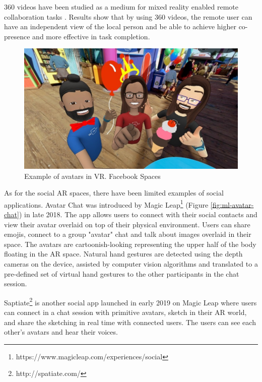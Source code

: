 360 videos have been studied as a medium for mixed reality enabled remote collaboration tasks \cite{Tang2017a, Lee2017, lee2017mixed, Lee2019}. Results show that by using 360 videos, the remote user can have an independent view of the local person and be able to achieve higher co-presence and more effective in task completion. 

\begin{figure}
    \centering
    \includegraphics[width=0.8\linewidth]{images/facebook-spaces.jpg}
    \caption{Example of avatars in VR. Facebook Spaces}
    \label{fig:facebook-spaces}
\end{figure}

As for the social AR spaces, there have been limited examples of social applications. Avatar Chat was introduced by Magic Leap\footnote{https://www.magicleap.com/experiences/social} (Figure \ref{fig:ml-avatar-chat}) in late 2018. The app allows users to connect with their social contacts and view their avatar overlaid on top of their physical environment. Users can share emojis, connect to a group "avatar" chat and talk about images overlaid in their space. The avatars are cartoonish-looking representing the upper half of the body floating in the AR space. Natural hand gestures are detected using the depth cameras on the device, assisted by computer vision algorithms and translated to a pre-defined set of virtual hand gestures to the other participants in the chat session. 

Saptiate\footnote{http://spatiate.com/} is another social app launched in early 2019 on Magic Leap where users can connect in a chat session with primitive avatars, sketch in their AR world, and share the sketching in real time with connected users. The users can see each other's avatars and hear their voices. 

